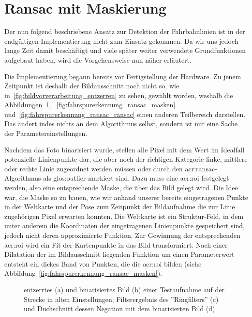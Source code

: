 \section{Ransac mit Maskierung}

Der nun folgend beschriebene Ansatz zur Detektion der Fahrbahnlinien ist in der endgültigen Implementierung nicht zum Einsatz gekommen. Da wir uns jedoch lange Zeit damit beschäftigt und viele später weiter verwendete Grundfunktionen aufgebaut haben, wird die Vorgehensweise nun näher erläutert.

Die Implementierung begann bereits vor Fertigstellung der Hardware. Zu jenem Zeitpunkt ist deshalb der Bildausschnitt noch nicht so, wie in~\ref{fig:bildvorverarbeitung_entzerren} zu sehen, gewählt worden, weshalb die Abbildungen~\ref{fig:fahrspurerkennung_ransac_binarisieren}, ~\ref{fig:fahrspurerkennung_ransac_masken} und~\ref{fig:fahrspurerkennung_ransac_ransac} einen anderen Teilbereich darstellen. Das ändert indes nichts an dem Algorithmus selbst, sondern ist nur eine Sache der Parametereinstellungen. 

Nachdem das Foto binarisiert wurde, stellen alle Pixel mit dem Wert \grqq{} im Idealfall potenzielle Linienpunkte dar, die aber noch der richtigen Kategorie \glqq linke\grqq , \glqq mittlere\grqq{} oder \glqq rechte\grqq{} Linie zugeordnet werden müssen oder durch den \gls{acr:ransac}-Algorithmus als \gls{glos:outlier} markiert sind. Dazu muss eine \gls{acr:roi} festgelegt werden, also eine entsprechende Maske, die über das Bild gelegt wird. Die Idee war, die Maske so zu bauen, wie wir anhand unserer bereits eingetragenen Punkte in der Weltkarte und der Pose zum Zeitpunkt der Bildaufnahme die zur Linie zugehörigen Pixel erwarten konnten. Die Weltkarte ist ein Struktur-Feld, in dem unter anderem die Koordinaten der eingetragenen Linienpunkte gespeichert sind, jedoch nicht deren approximierte Funktion. Zur Gewinnung der entsprechenden \gls{acr:roi} wird ein Fit der Kartenpunkte in das Bild transformiert. Nach einer Dilatation der im Bildausschnitt liegenden Funktion um einen Parameterwert entsteht ein dickes Band von Punkten, die die \gls{acr:roi} bilden (siehe Abbildung~\ref{fig:fahrspurerkennung_ransac_masken}).

\begin{figure}[H]
  \centering
  \qquad \quad
  \qquad \quad
  \qquad \quad
  \caption{entzerrtes (a) und binarisiertes Bild (b) einer Testaufnahme auf der Strecke in alten Einstellungen; Filterergebnis des ''Ringfilters'' (c) und Duchschnitt dessen Negation mit dem binarisierten Bild (d)}
\label{fig:fahrspurerkennung_ransac_binarisieren}
\end{figure} 

